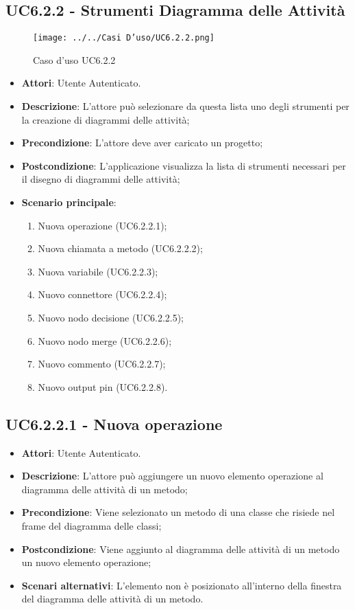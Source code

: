 \subsection{UC6.2.2 - Strumenti Diagramma delle Attività} 
\label{ssec:UC6.2.2} 
\begin{figure}[h!] 
\centering 
\texttt{[image: ../../Casi D'uso/UC6.2.2.png]} 
\caption{Caso d'uso UC6.2.2} 
 \end{figure} 
\begin{itemize} 
\item \textbf{Attori}: Utente Autenticato.
\item \textbf{Descrizione}: L'attore può selezionare da questa lista uno degli strumenti per la creazione di diagrammi delle attività;
\item \textbf{Precondizione}: L'attore deve aver caricato un progetto;
\item \textbf{Postcondizione}: L'applicazione visualizza la lista di strumenti necessari per il disegno di diagrammi delle attività;
\item \textbf{Scenario principale}: \begin{enumerate}\item Nuova operazione (UC6.2.2.1);\item Nuova chiamata a metodo (UC6.2.2.2);\item Nuova variabile (UC6.2.2.3);\item Nuovo connettore (UC6.2.2.4);\item Nuovo nodo decisione (UC6.2.2.5);\item Nuovo nodo merge (UC6.2.2.6);\item Nuovo commento (UC6.2.2.7);\item Nuovo output pin (UC6.2.2.8). 
 \end{enumerate}
\end{itemize} 
\subsection{UC6.2.2.1 - Nuova operazione} 
\label{ssec:UC6.2.2.1} 
\begin{itemize} 
\item \textbf{Attori}: Utente Autenticato.
\item \textbf{Descrizione}: L'attore può aggiungere un nuovo elemento operazione al diagramma delle attività di un metodo;
\item \textbf{Precondizione}: Viene selezionato un metodo di una classe che risiede nel frame del diagramma delle  classi;
\item \textbf{Postcondizione}: Viene aggiunto al diagramma delle attività di un metodo un nuovo elemento operazione;
\item \textbf{Scenari alternativi}: L'elemento non è posizionato all'interno della finestra del diagramma delle attività di un metodo.
\end{itemize} 
